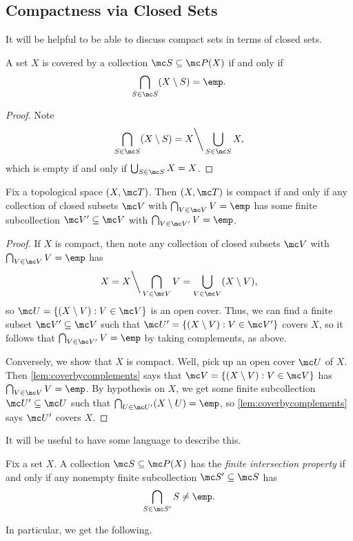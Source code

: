\documentclass[../notes.tex]{subfiles}
\begin{document}
\subsection{Compactness via Closed Sets}
It will be helpful to be able to discuss compact sets in terms of closed sets.
\begin{lemma} \label{lem:coverbycomplements}
	A set $X$ is covered by a collection $\mc S\subseteq\mc P(X)$ if and only if
	\[\bigcap_{S\in\mc S}(X\setminus S)=\emp.\]
\end{lemma}
\begin{proof}
	Note
	\[\bigcap_{S\in\mc S}(X\setminus S)=X{\mathbin\bigg\backslash}\bigcup_{S\in\mc S}X,\]
	which is empty if and only if $\bigcup_{S\in\mc S}X=X$.
\end{proof}
\begin{corollary} \label{cor:closedcompac}
	Fix a topological space $(X,\mc T)$. Then $(X,\mc T)$ is compact if and only if any collection of closed subsets $\mc V$ with $\bigcap_{V\in\mc V}V=\emp$ has some finite subcollection $\mc V'\subseteq\mc V$ with $\bigcap_{V\in\mc V'}V=\emp$.
\end{corollary}
\begin{proof}
	If $X$ is compact, then note any collection of closed subsets $\mc V$ with $\bigcap_{V\in\mc V}V=\emp$ has
	\[X=X{\mathbin\bigg\backslash}\bigcap_{V\in\mc V}V=\bigcup_{V\in\mc V}(X\setminus V),\]
	so $\mc U=\{(X\setminus V):V\in\mc V\}$ is an open cover. Thus, we can find a finite subset $\mc V'\subseteq\mc V$ such that $\mc U'=\{(X\setminus V):V\in\mc V'\}$ covers $X$, so it follows that $\bigcap_{V\in\mc V'}V=\emp$ by taking complements, as above.

	Conversely, we show that $X$ is compact. Well, pick up an open cover $\mc U$ of $X$. Then \autoref{lem:coverbycomplements} says that $\mc V=\{(X\setminus V):V\in\mc V\}$ has $\bigcap_{V\in\mc V}V=\emp$. By hypothesis on $X$, we get some finite subcollection $\mc U'\subseteq\mc U$ such that $\bigcap_{U\in\mc U'}(X\setminus U)=\emp$, so \autoref{lem:coverbycomplements} says $\mc U'$ covers $X$.
\end{proof}
It will be useful to have some language to describe this.
\begin{definition}
	Fix a set $X$. A collection $\mc S\subseteq\mc P(X)$ has the \textit{finite intersection property} if and only if any nonempty finite subcollection $\mc S'\subseteq\mc S$ has
	\[\bigcap_{S\in\mc S'}S\ne\emp.\]
\end{definition}
In particular, we get the following.
\end{document}
